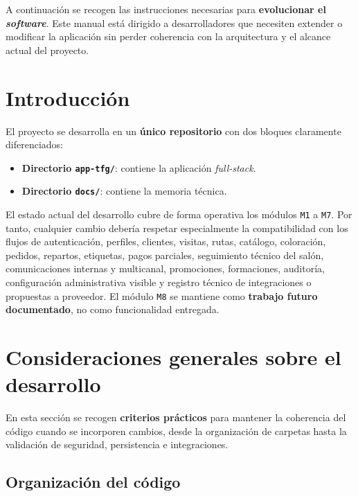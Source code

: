 A continuación se recogen las instrucciones necesarias para \textbf{evolucionar el \textit{software}}. Este manual está dirigido a desarrolladores que necesiten extender o modificar la aplicación sin perder coherencia con la arquitectura y el alcance actual del proyecto.

\section{Introducción}

El proyecto se desarrolla en un \textbf{único repositorio} con dos bloques claramente diferenciados:

\begin{itemize}
    \item \textbf{Directorio \texttt{app-tfg/}}: contiene la aplicación \textit{full-stack}.
    \item \textbf{Directorio \texttt{docs/}}: contiene la memoria técnica.
\end{itemize}

El estado actual del desarrollo cubre de forma operativa los módulos \texttt{M1} a \texttt{M7}. Por tanto, cualquier cambio debería respetar especialmente la compatibilidad con los flujos de autenticación, perfiles, clientes, visitas, rutas, catálogo, coloración, pedidos, repartos, etiquetas, pagos parciales, seguimiento técnico del salón, comunicaciones internas y multicanal, promociones, formaciones, auditoría, configuración administrativa visible y registro técnico de integraciones o propuestas a proveedor. El módulo \texttt{M8} se mantiene como \textbf{trabajo futuro documentado}, no como funcionalidad entregada.



\section{Consideraciones generales sobre el desarrollo}

En esta sección se recogen \textbf{criterios prácticos} para mantener la coherencia del código cuando se incorporen cambios, desde la organización de carpetas hasta la validación de seguridad, persistencia e integraciones.

\subsection{Organización del código}

